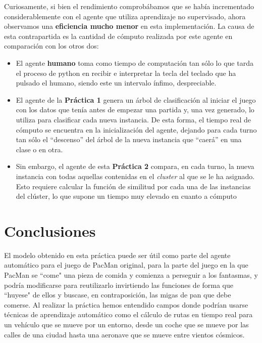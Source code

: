 \documentclass[12pt]{article}
\begin{document}
Curiosamente, si bien el rendimiento comprobábamos que se había incrementado considerablemente con el agente que utiliza aprendizaje no supervisado, ahora observamos una \textbf{eficiencia mucho menor} en esta implementación. La causa de esta contrapartida es la cantidad de cómputo realizada por este agente en comparación con los otros dos:
\begin{itemize}
    \item El agente \textbf{humano} toma como tiempo de computación tan sólo lo que tarda el proceso de python en recibir e interpretar la tecla del teclado que ha pulsado el humano, siendo este un intervalo ínfimo, despreciable.
    \item El agente de la \textbf{Práctica 1} genera un árbol de clasificación al iniciar el juego con los datos que tenía antes de empezar una partida y, una vez generado, lo utiliza para clasificar cada nueva instancia. De esta forma, el tiempo real de cómputo se encuentra en la inicialización del agente, dejando para cada turno tan sólo el ``descenso'' del árbol de la nueva instancia que ``caerá'' en una clase o en otra.
    \item Sin embargo, el agente de esta \textbf{Práctica 2} compara, en cada turno, la nueva instancia con todas aquellas contenidas en el \emph{cluster} al que se le ha asignado. Esto requiere calcular la función de similitud por cada una de las instancias del clúster, lo que supone un tiempo muy elevado en cuanto a cómputo
\end{itemize}




\newpage
\section{Conclusiones}

El modelo obtenido en esta práctica puede ser útil como parte del agente automático para el juego de PacMan original, para la parte del juego en la que PacMan se ``come" una pieza de comida y comienza a perseguir a los fantasmas, y podría modificarse para reutilizarlo invirtiendo las funciones de forma que ``huyese" de ellos y buscase, en contraposición, las migas de pan que debe comerse.
Al realizar la práctica hemos entendido campos donde podrían usarse técnicas de aprendizaje automático como el cálculo de rutas en tiempo real para un vehículo que se mueve por un entorno, desde un coche que se mueve por las calles de una ciudad hasta una aeronave que se mueve entre vientos cósmicos.
\end{document}
